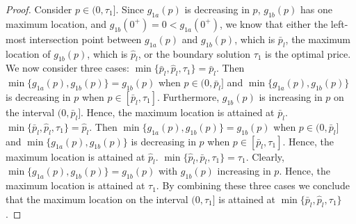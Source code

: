 \documentclass[11pt]{article}
\newcommand{\1}{\mathds{1}}
\begin{document}
\begin{proof}
    Consider $p \in (0,\tau_1]$. Since $g_{1a}(p)$ is decreasing in $p$, $g_{1b}(p)$ has one maximum location, and $g_{1b}(0^+)=0 < g_{1a}(0^+)$, we know that either the left-most intersection point between $g_{1a}(p)$ and $g_{1b}(p)$, which is $\bar{p}_l$, the maximum location of $g_{1b}(p)$, which is $\hat{p}_l$, or the boundary solution $\tau_1$ is the optimal price. We now consider three cases:  $\min\{\bar{p}_l,\hat{p}_l,\tau_1\} = \bar{p}_l$. Then $\min\{g_{1a}(p),g_{1b}(p)\} = g_{1b}(p)$ when $p \in (0,\bar{p}_l]$ and $\min\{g_{1a}(p),g_{1b}(p)\}$ is decreasing in $p$ when $p \in [\bar{p}_l,\tau_1]$. Furthermore, $g_{1b}(p)$ is increasing in $p$ on the interval $(0,\bar{p}_l]$. Hence, the maximum location is attained at $\bar{p}_l$.  $\min\{\bar{p}_l,\hat{p}_l,\tau_1\} = \hat{p}_l$. Then $\min\{g_{1a}(p),g_{1b}(p)\} = g_{1b}(p)$ when $p \in (0,\bar{p}_l]$ and $\min\{g_{1a}(p),g_{1b}(p)\}$ is decreasing in $p$ when $p \in [\bar{p}_l,\tau_1]$. Hence, the maximum location is attained at $\hat{p}_l$.  $\min\{\hat{p}_l,\bar{p}_l,\tau_1\} = \tau_1$. Clearly, $\min\{g_{1a}(p),g_{1b}(p)\}=g_{1b}(p)$ with $g_{1b}(p)$ increasing in $p$. Hence, the maximum location is attained at $\tau_1$. By combining these three cases we conclude that the maximum location on the interval $(0,\tau_1]$ is attained at $\min\{\bar{p}_l,\hat{p}_l,\tau_1\}$. 
    

\end{proof}
\end{document}
